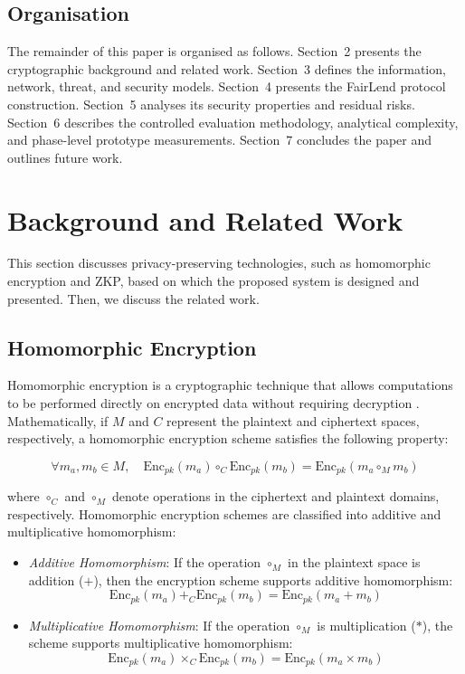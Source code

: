\documentclass[a4paper,fleqn]{cas-dc}
\begin{document}
\subsection{Organisation}

The remainder of this paper is organised as follows. Section~2 presents the cryptographic background and related work. Section~3 defines the information, network, threat, and security models. Section~4 presents the FairLend protocol construction. Section~5 analyses its security properties and residual risks. Section~6 describes the controlled evaluation methodology, analytical complexity, and phase-level prototype measurements. Section~7 concludes the paper and outlines future work.

\section{Background and Related Work}
This section discusses privacy-preserving technologies, such as homomorphic encryption and ZKP, based on which the proposed system is designed and presented. Then, we discuss the related work.

\subsection{Homomorphic Encryption}

Homomorphic encryption is a cryptographic technique that allows computations to be performed directly on encrypted data without requiring decryption \cite{fan2012somewhat}. Mathematically, if \( M \) and \( C \) represent the plaintext and ciphertext spaces, respectively, a homomorphic encryption scheme satisfies the following property:

\begin{equation}
\label{eq1}
\forall m_a, m_b \in M, \quad \text{Enc}_{pk}(m_a) \circ_C \text{Enc}_{pk}(m_b) = \text{Enc}_{pk}(m_a \circ_M m_b)
\end{equation}

where \( \circ_C \) and \( \circ_M \) denote operations in the ciphertext and plaintext domains, respectively. Homomorphic encryption schemes are classified into additive and multiplicative homomorphism:

\begin{itemize}
    \item \textit{Additive Homomorphism}: If the operation \( \circ_M \) in the plaintext space is addition (\(+\)), then the encryption scheme supports additive homomorphism:
    \begin{equation}
    \label{eq2}
    \text{Enc}_{pk}(m_a) +_C \text{Enc}_{pk}(m_b) = \text{Enc}_{pk}(m_a + m_b)
    \end{equation}

    \item \textit{Multiplicative Homomorphism}: If the operation \( \circ_M \) is multiplication (\(*\)), the scheme supports multiplicative homomorphism:
    \begin{equation}
    \label{eq3}
    \text{Enc}_{pk}(m_a) \times_C \text{Enc}_{pk}(m_b) = \text{Enc}_{pk}(m_a \times m_b)
    \end{equation}
\end{itemize}
\end{document}
